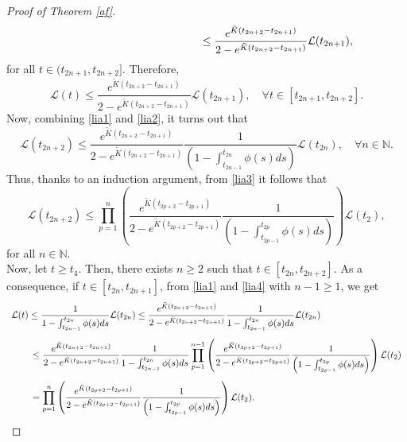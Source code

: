 \documentclass[a4paper,11pt,oneside]{article}
\begin{document}
\begin{proof}[Proof of Theorem \ref{af}]
$$\begin{array}{l}
		\displaystyle{\hspace{4.5cm}\leq \frac{e^{\tilde K(t_{2n+2}-t_{2n+1})}}{2-e^{\tilde K(t_{2n+2}-t_{2n+1})}}\mathcal{L}(t_{2n+1}),}
	\end{array}$$
	for all $t\in (t_{2n+1},t_{2n+2}]$. 
	Therefore, 
	\begin{equation}\label{lia2}
		\mathcal{L}(t)\leq \frac{e^{\tilde K(t_{2n+2}-t_{2n+1})}}{2-e^{\tilde K(t_{2n+2}-t_{2n+1})}}\mathcal{L}(t_{2n+1}),\quad \forall t\in [t_{2n+1},t_{2n+2}].
	\end{equation}
	Now, combining \eqref{lia1} and \eqref{lia2}, it turns out that
	\begin{equation}\label{lia3}
		\mathcal{L}(t_{2n+2})\leq \frac{e^{\tilde K(t_{2n+2}-t_{2n+1})}}{2-e^{\tilde K(t_{2n+2}-t_{2n+1})}}\frac{1}{\left(1-\int_{t_{2n-1}}^{t_{2n}}\phi(s)ds\right)}\mathcal{L}(t_{2n}),\quad \forall n\in \mathbb{N}.
	\end{equation}
	Thus, thanks to an induction argument, from \eqref{lia3} it follows that 
	\begin{equation}\label{lia4}
			\mathcal{L}(t_{2n+2})\leq \prod_{p=1}^{n}\left(\frac{e^{\tilde K(t_{2p+2}-t_{2p+1})}}{2-e^{\tilde K(t_{2p+2}-t_{2p+1})}}\frac{1}{\left(1-\int_{t_{2p-1}}^{t_{2p}}\phi(s)ds\right)}\right)\mathcal{L}(t_2),
	\end{equation}
	for all $n\in \mathbb{N}$. 
	\\Now, let $t\geq t_4$. Then, there exists $n\geq 2$ such that $t\in [t_{2n},t_{2n+2}]$. As a consequence, if $t\in [t_{2n},t_{2n+1}]$, from \eqref{lia1} and \eqref{lia4} with $n-1\geq 1$, we get
	$$\begin{array}{l}
		\vspace{0.3cm}\displaystyle{\mathcal{L}(t)\leq \frac{1}{1-\int_{t_{2n-1}}^{t_{2n}}\phi(s)ds}\mathcal{L}(t_{2n})\leq \frac{e^{\tilde{K}(t_{2n+2}-t_{2n+1})}}{2-e^{\tilde{K}(t_{2n+2}-t_{2n+1})}}\frac{1}{1-\int_{t_{2n-1}}^{t_{2n}}\phi(s)ds}\mathcal{L}(t_{2n})}\\
		\vspace{0.3cm}\displaystyle{\hspace{0.8cm}\leq \frac{e^{\tilde{K}(t_{2n+2}-t_{2n+1})}}{2-e^{\tilde{K}(t_{2n+2}-t_{2n+1})}}\frac{1}{1-\int_{t_{2n-1}}^{t_{2n}}\phi(s)ds}\prod_{p=1}^{n-1}\left(\frac{e^{\tilde K(t_{2p+2}-t_{2p+1})}}{2-e^{\tilde K(t_{2p+2}-t_{2p+1})}}\frac{1}{\left(1-\int_{t_{2p-1}}^{t_{2p}}\phi(s)ds\right)}\right)\mathcal{L}(t_2)}\\
		\displaystyle{\hspace{0.8cm}=\prod_{p=1}^{n}\left(\frac{e^{\tilde K(t_{2p+2}-t_{2p+1})}}{2-e^{\tilde K(t_{2p+2}-t_{2p+1})}}\frac{1}{\left(1-\int_{t_{2p-1}}^{t_{2p}}\phi(s)ds\right)}\right)\mathcal{L}(t_2).}

\end{array}$$
\end{proof}
\end{document}

